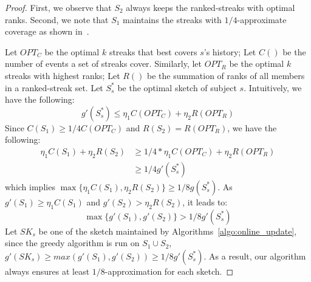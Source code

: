 \begin{proof}
First, we observe that $S_2$ always keeps the ranked-streaks with optimal ranks. 
Second, we note that $S_1$ maintains the streaks with $1/4$-approximate coverage as shown in~\cite{Saha2009On}.

Let $OPT_C$ be the optimal $k$ streaks that best covers $s$'s history; Let $C()$ be the number of events a set of streaks cover. Similarly, let $OPT_R$ be the optimal $k$ streaks with highest ranks; Let $R()$ be the 
summation of ranks of all members in a ranked-streak set. Let $S^*_s$ be the optimal sketch of subject $s$. Intuitively, we have the following: 
\begin{equation*} 
g'(S^*_s) \leq \eta_1 C(OPT_C) + \eta_2 R(OPT_R)
\end{equation*}
Since $C(S_1) \geq 1/4 C(OPT_C)$ and $R(S_2) = R(OPT_R)$, we have the following:
\begin{equation*}
\begin{split}
\eta_1 C(S_1) + \eta_2 R(S_2) & \geq 1/4 * \eta_1 C(OPT_C) + \eta_2 R(OPT_R) \\
& \geq 1/4 g'(S^*_s)
\end{split}
\end{equation*}
which implies $\max\{\eta_1 C(S_1), \eta_2 R(S_2)\} \geq 1/8 g( S^*_s)$. 
As $g'(S_1) \geq \eta_1 C(S_1)$ and $g'(S_2) > \eta_2 R(S_2)$, it leads to:
\begin{equation*}
\max\{g'(S_1), g'(S_2)\} > 1/8  g'(S^*_s)
\end{equation*}
Let $SK_s$ be one of the sketch maintained by Algorithms~\ref{algo:online_update},
since the greedy algorithm is run on $S_1 \cup S_2$, 
$g'(SK_s) \geq max(g'(S_1), g'(S_2)) \geq 1/8 g'(S^*_s)$.
As a result, our algorithm always ensures at least $1/8$-approximation for each sketch.
\end{proof}

